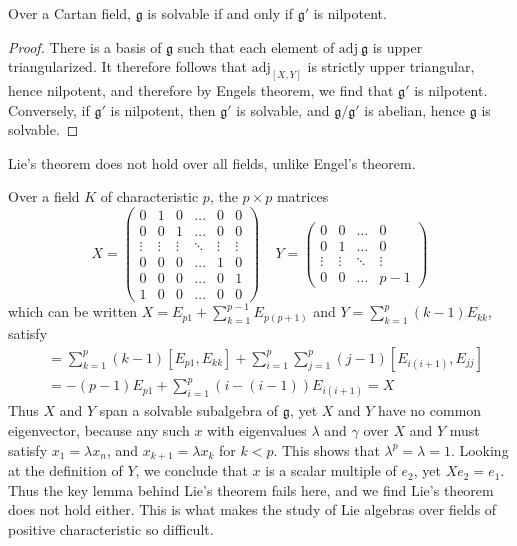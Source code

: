 \begin{theorem}
    Over a Cartan field, $\mathfrak{g}$ is solvable if and only if $\mathfrak{g}'$ is nilpotent.
\end{theorem}
\begin{proof}
    There is a basis of $\mathfrak{g}$ such that each element of $\text{adj}\ \mathfrak{g}$ is upper triangularized. It therefore follows that $\text{adj}_{[X,Y]}$ is strictly upper triangular, hence nilpotent, and therefore by Engels theorem, we find that $\mathfrak{g}'$ is nilpotent. Conversely, if $\mathfrak{g}'$ is nilpotent, then $\mathfrak{g}'$ is solvable, and $\mathfrak{g}/\mathfrak{g}'$ is abelian, hence $\mathfrak{g}$ is solvable.
\end{proof}

Lie's theorem does not hold over all fields, unlike Engel's theorem.

\begin{example}
    Over a field $K$ of characteristic $p$, the $p \times p$ matrices
    \[ X = \begin{pmatrix} 0 & 1 & 0 & \dots & 0 & 0 \\ 0 & 0 & 1 & \dots & 0 & 0 \\ \vdots & \vdots & \vdots & \ddots & \vdots & \vdots \\ 0 & 0 & 0 & \dots & 1 & 0 \\ 0 & 0 & 0 & \dots & 0 & 1 \\ 1 & 0 & 0 & \dots & 0 & 0 \end{pmatrix}\ \ \ \ \ Y = \begin{pmatrix} 0 & 0 & \dots & 0 \\ 0 & 1 & \dots & 0 \\ \vdots & \vdots & \ddots & \vdots \\ 0 & 0 & \dots & p-1 \end{pmatrix} \]
    which can be written $X = E_{p1} + \sum_{k = 1}^{p-1} E_{p(p+1)}$ and $Y = \sum_{k = 1}^p (k-1) E_{kk}$, satisfy
    \begin{align*}
        [X,Y] &= \sum_{k = 1}^p (k-1) [E_{p1}, E_{kk}] + \sum_{i = 1}^p \sum_{j = 1}^p (j-1) [E_{i(i+1)}, E_{jj}]\\
        &= -(p-1) E_{p1} + \sum_{i = 1}^p (i - (i-1)) E_{i(i+1)} = X
    \end{align*}
    Thus $X$ and $Y$ span a solvable subalgebra of $\mathfrak{g}$, yet $X$ and $Y$ have no common eigenvector, because any such $x$ with eigenvalues $\lambda$ and $\gamma$ over $X$ and $Y$ must satisfy $x_1 = \lambda x_n$, and $x_{k+1} = \lambda x_k$ for $k < p$. This shows that $\lambda^p = \lambda = 1$. Looking at the definition of $Y$, we conclude that $x$ is a scalar multiple of $e_2$, yet $Xe_2 = e_1$. Thus the key lemma behind Lie's theorem fails here, and we find Lie's theorem does not hold either. This is what makes the study of Lie algebras over fields of positive characteristic so difficult.
\end{example}

